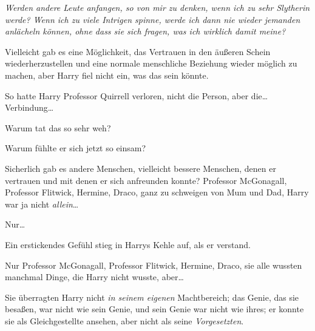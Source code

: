 \emph{Werden andere Leute anfangen, so von mir zu denken, wenn ich zu sehr Slytherin werde? Wenn ich zu viele Intrigen spinne, werde ich dann nie wieder jemanden anlächeln können, ohne dass sie sich fragen, was ich wirklich damit meine?}

Vielleicht gab es eine Möglichkeit, das Vertrauen in den äußeren Schein wiederherzustellen und eine normale menschliche Beziehung wieder möglich zu machen, aber Harry fiel nicht ein, was das sein könnte.

So hatte Harry Professor Quirrell verloren, nicht die Person, aber die… Verbindung…

Warum tat das so sehr weh?

Warum fühlte er sich jetzt so einsam?

Sicherlich gab es andere Menschen, vielleicht bessere Menschen, denen er vertrauen und mit denen er sich anfreunden konnte? Professor McGonagall, Professor Flitwick, Hermine, Draco, ganz zu schweigen von Mum und Dad, Harry war ja nicht \emph{allein}…

Nur…

Ein erstickendes Gefühl stieg in Harrys Kehle auf, als er verstand.

Nur Professor McGonagall, Professor Flitwick, Hermine, Draco, sie alle wussten manchmal Dinge, die Harry nicht wusste, aber…

Sie überragten Harry nicht \emph{in seinem eigenen} Machtbereich; das Genie, das sie besaßen, war nicht wie sein Genie, und sein Genie war nicht wie ihres; er konnte sie als Gleichgestellte ansehen, aber nicht als seine \emph{Vorgesetzten}.

